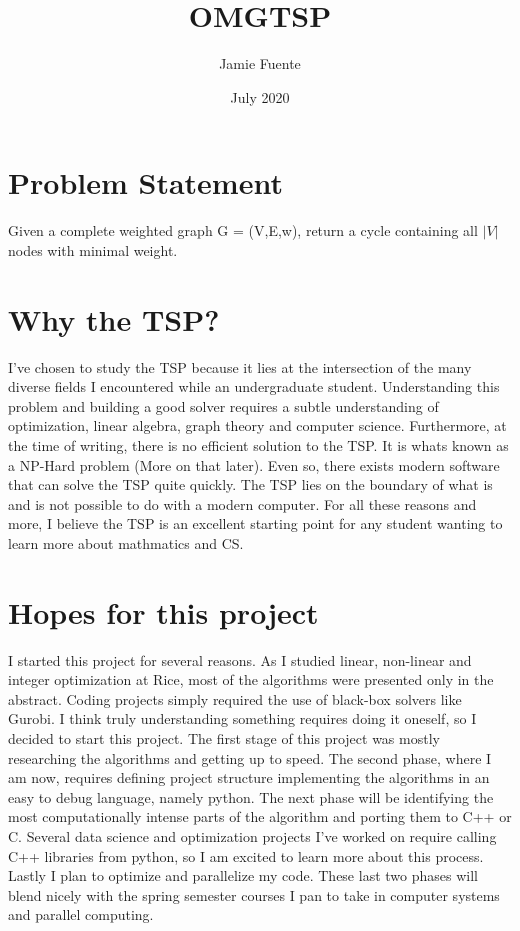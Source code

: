 \documentclass{article}
\title{OMGTSP}
\author{Jamie Fuente}
\date{July 2020}
\begin{document}
    \maketitle
    \section*{Problem Statement}
        Given a complete weighted graph G = (V,E,w), return a cycle containing all $|V|$ nodes
        with minimal weight.
    \section*{Why the TSP?}
        I've chosen to study the TSP because it lies at the intersection of the many diverse fields
        I encountered while an undergraduate student.
        Understanding this problem and building a good solver requires a subtle understanding of optimization, linear
        algebra, graph theory and computer science.
        Furthermore, at the time of writing, there is no efficient solution to the TSP. It is whats known as a NP-Hard
        problem (More on that later).
        Even so, there exists modern software that can solve the TSP quite quickly.
        The TSP lies on the boundary of what is and is not possible to do with a modern computer.
        For all these reasons and more, I believe the TSP is an excellent starting point for any student wanting to
        learn more about mathmatics and CS.
    \section*{Hopes for this project}
        I started this project for several reasons.
        As I studied linear, non-linear and integer optimization at Rice, most of the algorithms were presented only in the
        abstract.
        Coding projects simply required the use of black-box solvers like Gurobi.
        I think truly understanding something requires doing it oneself, so I decided to start this project.
        The first stage of this project was mostly researching the algorithms and getting up to speed.
        The second phase, where I am now, requires defining project structure implementing the algorithms in
        an easy to debug language, namely python.
        The next phase will be identifying the most computationally intense parts of the algorithm and porting them
        to C++ or C.
        Several data science and optimization projects I've worked on require calling C++ libraries from python, so I am
        excited to learn more about this process.
        Lastly I plan to optimize and parallelize my code.
        These last two phases will blend nicely with the spring semester courses I pan to take in computer systems and
        parallel computing.
    \newpage
\end{document}
